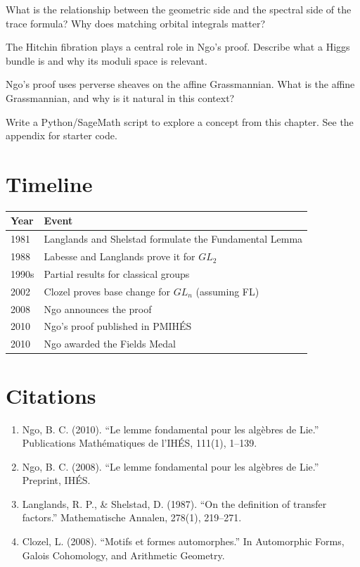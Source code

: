 \begin{exercise}[Intermediate]
What is the relationship between the geometric side and the spectral side of the trace formula? Why does matching orbital integrals matter?
\end{exercise}

\begin{exercise}[Challenge]
The Hitchin fibration plays a central role in Ngo's proof. Describe what a Higgs bundle is and why its moduli space is relevant.
\end{exercise}

\begin{exercise}
Ngo's proof uses perverse sheaves on the affine Grassmannian. What is the affine Grassmannian, and why is it natural in this context?
\end{exercise}


\begin{exercise}[Computational]
Write a Python/SageMath script to explore a concept from this chapter. See the appendix for starter code.
\end{exercise}

\section{Timeline}

\begin{tabularx}{\linewidth}{lX}
\toprule
\textbf{Year} & \textbf{Event} \\ \midrule
1981 & Langlands and Shelstad formulate the Fundamental Lemma \cite{langlands1987} \\ 
1988 & Labesse and Langlands prove it for $GL_2$ \\ 
1990s & Partial results for classical groups \\ 
2002 & Clozel proves base change for $GL_n$ (assuming FL) \\ 
2008 & Ngo announces the proof \cite{ngo2008} \\ 
2010 & Ngo's proof published in PMIH\'ES \cite{ngo2010} \\ 
2010 & Ngo awarded the Fields Medal \\ \bottomrule
\end{tabularx}

\section{Citations}

\begin{enumerate}
\item Ngo, B. C. (2010). ``Le lemme fondamental pour les alg\`ebres de Lie.'' Publications Math\'ematiques de l'IH\'ES, 111(1), 1--139.
\item Ngo, B. C. (2008). ``Le lemme fondamental pour les alg\`ebres de Lie.'' Preprint, IH\'ES.
\item Langlands, R. P., \& Shelstad, D. (1987). ``On the definition of transfer factors.'' Mathematische Annalen, 278(1), 219--271.
\item Clozel, L. (2008). ``Motifs et formes automorphes.'' In Automorphic Forms, Galois Cohomology, and Arithmetic Geometry.
\end{enumerate}
